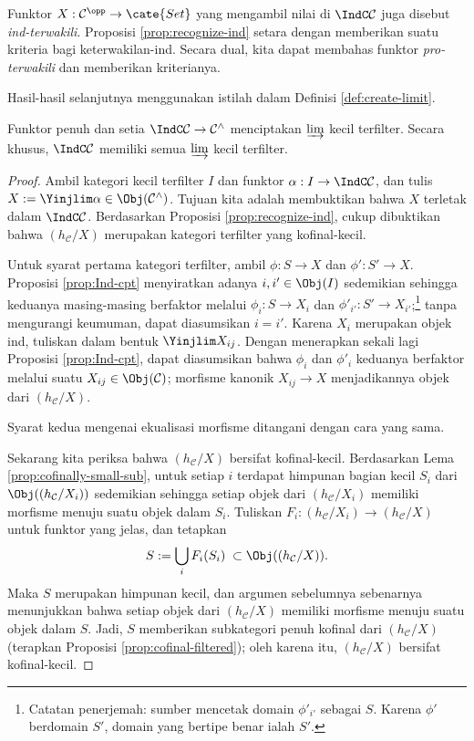 Funktor $X: \mathcal{C}^{\opp} \to \cate{Set}$ yang mengambil nilai di $\IndC\mathcal{C}$ juga disebut \emph{ind-terwakili}. Proposisi \ref{prop:recognize-ind} setara dengan memberikan suatu kriteria bagi keterwakilan-ind. Secara dual, kita dapat membahas funktor \emph{pro-terwakili} dan memberikan kriterianya.

Hasil-hasil selanjutnya menggunakan istilah dalam Definisi \ref{def:create-limit}.

\begin{proposition}\label{prop:Ind-filtered-colim}
	Funktor penuh dan setia $\IndC\mathcal{C} \to \mathcal{C}^\wedge$ menciptakan $\varinjlim$ kecil terfilter. Secara khusus, $\IndC\mathcal{C}$ memiliki semua $\varinjlim$ kecil terfilter.
\end{proposition}
\begin{proof}
	Ambil kategori kecil terfilter $I$ dan funktor $\alpha: I \to \IndC\mathcal{C}$, dan tulis $X := \Yinjlim \alpha \in \Obj(\mathcal{C}^\wedge)$. Tujuan kita adalah membuktikan bahwa $X$ terletak dalam $\IndC\mathcal{C}$. Berdasarkan Proposisi \ref{prop:recognize-ind}, cukup dibuktikan bahwa $(h_{\mathcal{C}}/X)$ merupakan kategori terfilter yang kofinal-kecil.
	
	Untuk syarat pertama kategori terfilter, ambil $\phi: S \to X$ dan $\phi': S' \to X$. Proposisi \ref{prop:Ind-cpt} menyiratkan adanya $i, i' \in \Obj(I)$ sedemikian sehingga keduanya masing-masing berfaktor melalui $\phi_i: S \to X_i$ dan $\phi'_{i'}: S' \to X_{i'}$;\footnote{Catatan penerjemah: sumber mencetak domain $\phi'_{i'}$ sebagai $S$. Karena $\phi'$ berdomain $S'$, domain yang bertipe benar ialah $S'$.} tanpa mengurangi keumuman, dapat diasumsikan $i = i'$. Karena $X_i$ merupakan objek ind, tuliskan dalam bentuk $\Yinjlim X_{ij}$. Dengan menerapkan sekali lagi Proposisi \ref{prop:Ind-cpt}, dapat diasumsikan bahwa $\phi_i$ dan $\phi'_i$ keduanya berfaktor melalui suatu $X_{ij} \in \Obj(\mathcal{C})$; morfisme kanonik $X_{ij} \to X$ menjadikannya objek dari $(h_{\mathcal{C}}/X)$.
	
	Syarat kedua mengenai ekualisasi morfisme ditangani dengan cara yang sama.
	
	Sekarang kita periksa bahwa $(h_{\mathcal{C}}/X)$ bersifat kofinal-kecil. Berdasarkan Lema \ref{prop:cofinally-small-sub}, untuk setiap $i$ terdapat himpunan bagian kecil $S_i$ dari $\Obj((h_{\mathcal{C}}/ X_i))$ sedemikian sehingga setiap objek dari $(h_{\mathcal{C}}/ X_i)$ memiliki morfisme menuju suatu objek dalam $S_i$. Tuliskan $F_i: (h_{\mathcal{C}}/ X_i) \to (h_{\mathcal{C}}/ X)$ untuk funktor yang jelas, dan tetapkan
	\[ S := \bigcup_i F_i(S_i) \;\subset \Obj((h_{\mathcal{C}}/ X)). \]
	Maka $S$ merupakan himpunan kecil, dan argumen sebelumnya sebenarnya menunjukkan bahwa setiap objek dari $(h_{\mathcal{C}}/ X)$ memiliki morfisme menuju suatu objek dalam $S$. Jadi, $S$ memberikan subkategori penuh kofinal dari $(h_{\mathcal{C}}/ X)$ (terapkan Proposisi \ref{prop:cofinal-filtered}); oleh karena itu, $(h_{\mathcal{C}}/ X)$ bersifat kofinal-kecil.
\end{proof}

